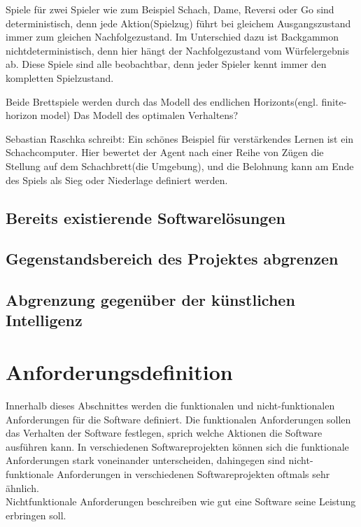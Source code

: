Spiele für zwei Spieler wie zum Beispiel Schach, Dame, Reversi oder Go sind deterministisch, denn jede Aktion(Spielzug) führt bei gleichem Ausgangszustand immer zum gleichen Nachfolgezustand. Im Unterschied dazu ist Backgammon nichtdeterministisch, denn hier hängt der Nachfolgezustand vom Würfelergebnis ab. Diese Spiele sind alle beobachtbar, denn jeder Spieler kennt immer den kompletten Spielzustand.\cite[114]{Ertel}



Beide Brettspiele werden durch das Modell des endlichen Horizonts(engl. finite-horizon model) 
Das Modell des optimalen Verhaltens?


Sebastian Raschka schreibt: Ein schönes Beispiel für verstärkendes Lernen ist ein Schachcomputer. Hier bewertet der Agent nach einer Reihe von Zügen die Stellung auf dem Schachbrett(die Umgebung), und die Belohnung kann am Ende des Spiels als Sieg oder Niederlage definiert werden.\cite[27]{Raschka}
\subsection{Bereits existierende Softwarelösungen}

\subsection{Gegenstandsbereich des Projektes abgrenzen}

\subsection{Abgrenzung gegenüber der künstlichen Intelligenz}

\section{Anforderungsdefinition}
\label{sec:anforderungsdefinition}
Innerhalb dieses Abschnittes werden die funktionalen und nicht-funktionalen Anforderungen für die Software definiert. Die funktionalen Anforderungen sollen das Verhalten der Software festlegen, sprich welche Aktionen die Software ausführen kann. In verschiedenen Softwareprojekten können sich die funktionale Anforderungen stark voneinander unterscheiden, dahingegen sind nicht-funktionale Anforderungen in verschiedenen Softwareprojekten oftmals sehr ähnlich.\\ 
Nichtfunktionale Anforderungen beschreiben wie gut eine Software seine Leistung erbringen soll.

